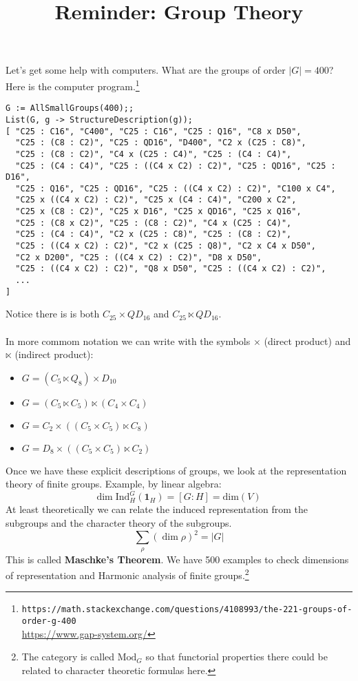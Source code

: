 \documentclass[12pt]{article}
\title{Reminder: Group Theory}
\date{}
\begin{document}
\sffamily

\maketitle

{\fontsize{16pt}{16pt}\selectfont 

\noindent Let's get some help with computers.  What are the groups of order $|G| = 400$?  Here is the computer program.\footnote{\texttt{https://math.stackexchange.com/questions/4108993/the-221-groups-of-order-g-400} \\
\url{https://www.gap-system.org/}}

\begin{verbatim}
G := AllSmallGroups(400);;
List(G, g -> StructureDescription(g));
[ "C25 : C16", "C400", "C25 : C16", "C25 : Q16", "C8 x D50",
  "C25 : (C8 : C2)", "C25 : QD16", "D400", "C2 x (C25 : C8)",
  "C25 : (C8 : C2)", "C4 x (C25 : C4)", "C25 : (C4 : C4)",
  "C25 : (C4 : C4)", "C25 : ((C4 x C2) : C2)", "C25 : QD16", "C25 : D16",
  "C25 : Q16", "C25 : QD16", "C25 : ((C4 x C2) : C2)", "C100 x C4",
  "C25 x ((C4 x C2) : C2)", "C25 x (C4 : C4)", "C200 x C2",
  "C25 x (C8 : C2)", "C25 x D16", "C25 x QD16", "C25 x Q16",
  "C25 : (C8 x C2)", "C25 : (C8 : C2)", "C4 x (C25 : C4)",
  "C25 : (C4 : C4)", "C2 x (C25 : C8)", "C25 : (C8 : C2)",
  "C25 : ((C4 x C2) : C2)", "C2 x (C25 : Q8)", "C2 x C4 x D50",
  "C2 x D200", "C25 : ((C4 x C2) : C2)", "D8 x D50",
  "C25 : ((C4 x C2) : C2)", "Q8 x D50", "C25 : ((C4 x C2) : C2)",
  ...
]
\end{verbatim}
Notice there is is both $C_{25} \times QD_{16}$ and $C_{25}\ltimes QD_{16}$. \\ \\
In more commom notation we can write with the symbols $\times$ (direct product) and $\ltimes$ (indirect product):
\begin{itemize}
\item $G = (C_5 \ltimes Q_8 ) \times D_{10}$
\item $G = (C_5 \ltimes C_5) \ltimes (C_4 \times C_4) $
\item $G = C_2 \times ((C_5 \times C_5) \ltimes C_8)$
\item $G = D_8 \times ((C_5 \times C_5) \ltimes C_2)$
\end{itemize}
Once we have these explicit descriptions of groups, we  look at the representation theory of finite groups.  Example, by linear algebra:
$$ \text{dim} \;\text{Ind}^G_H(\mathbf{1}_H) = [G:H] = \text{dim}(V) $$
At least theoretically we can relate the induced representation from the subgroups and the character theory of the subgroups.
$$ \sum_\rho (\dim \rho)^2 = |G| $$
This is called \textbf{Maschke's Theorem}.  We have 500 examples to check dimensions of representation and Harmonic analysis of finite groups.\footnote{The category is called $\text{Mod}_G$ so that functorial properties there could be related to character theoretic formulas here.}
\newpage

}
\end{document}
